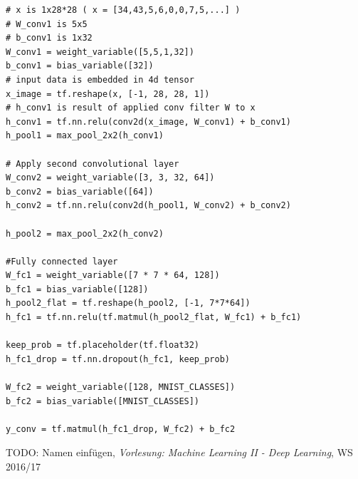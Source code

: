 \documentclass[10pt,journal,compsoc]{IEEEtran}
\begin{document}
\begin{lstlisting}[caption={Modellierung des Berechnungsgraphen.}, label=lst5]
# x is 1x28*28 ( x = [34,43,5,6,0,0,7,5,...] )
# W_conv1 is 5x5
# b_conv1 is 1x32
W_conv1 = weight_variable([5,5,1,32])
b_conv1 = bias_variable([32])
# input data is embedded in 4d tensor
x_image = tf.reshape(x, [-1, 28, 28, 1])
# h_conv1 is result of applied conv filter W to x
h_conv1 = tf.nn.relu(conv2d(x_image, W_conv1) + b_conv1)
h_pool1 = max_pool_2x2(h_conv1)

# Apply second convolutional layer
W_conv2 = weight_variable([3, 3, 32, 64])
b_conv2 = bias_variable([64])
h_conv2 = tf.nn.relu(conv2d(h_pool1, W_conv2) + b_conv2)
    
h_pool2 = max_pool_2x2(h_conv2)

#Fully connected layer
W_fc1 = weight_variable([7 * 7 * 64, 128])
b_fc1 = bias_variable([128])
h_pool2_flat = tf.reshape(h_pool2, [-1, 7*7*64])
h_fc1 = tf.nn.relu(tf.matmul(h_pool2_flat, W_fc1) + b_fc1)

keep_prob = tf.placeholder(tf.float32)
h_fc1_drop = tf.nn.dropout(h_fc1, keep_prob)

W_fc2 = weight_variable([128, MNIST_CLASSES])
b_fc2 = bias_variable([MNIST_CLASSES])

y_conv = tf.matmul(h_fc1_drop, W_fc2) + b_fc2
\end{lstlisting}

\ifCLASSOPTIONcaptionsoff
  \newpage
\fi

\begin{thebibliography}{1}
TODO: Namen einfügen, \emph{Vorlesung: Machine Learning II - Deep Learning}, WS 2016/17
\end{thebibliography}
\end{document}
